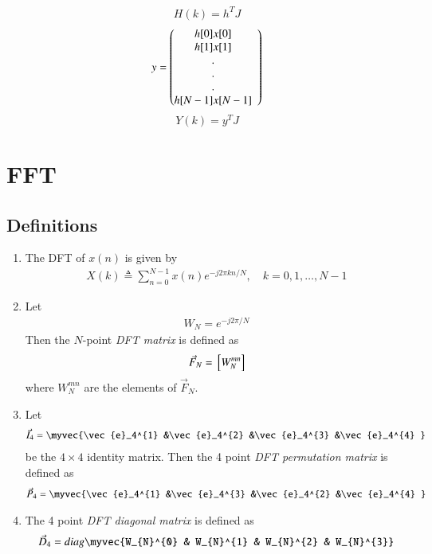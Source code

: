 \documentclass[journal,12pt,twocolumn]{IEEEtran}
\renewcommand\thesection{\arabic{section}}
\begin{document}
\begin{enumerate}[label=\thesection.\arabic*]
\begin{equation}
    H(k) = h^{T} J
\end{equation}
\[
\begin{array}{lc}
    y = 
  \left(\begin{array}{@{}ccc@{}}
    h[0] x[0] \\
    h[1] x[1] \\
    . \\
    . \\
    . \\
    h[N-1] x[N-1] \\
  \end{array}\right) \\[15pt]
\end{array}
\]
\begin{equation}
    Y(k) = y^{T} J
\end{equation} 

\end{enumerate}
%
\section{FFT}
\subsection{Definitions}
\begin{enumerate}[label=\arabic*.,ref=\thesection.\theenumi]
	\item The DFT of $x(n)$ is given by
	\begin{align}
		X(k) \triangleq \sum_{n=0}^{N-1} x(n) e^{-j 2 \pi k n / N}, \quad k=0,1, \ldots, N-1
	\end{align}
	\item Let 
	\begin{align}
		W_{N} = e^{-j2\pi/N} 
	\end{align}
	Then the $N$-point {\em DFT matrix} is defined as 
	\begin{align}
		\vec{F}_{N} = {}\left[W_{N}^{mn}\right]
	\end{align}
	where $W_{N}^{mn}$ are the elements of $\vec{F}_{N}$.
	\item Let 
	\begin{align}
		\vec{I}_4 = \myvec{\vec{e}_4^{1} &\vec{e}_4^{2} &\vec{e}_4^{3} &\vec{e}_4^{4} }
	\end{align}
	be the $4\times 4$ identity matrix.  Then the 4 point {\em DFT permutation matrix} is defined as 
	\begin{align}
		\vec{P}_4 = \myvec{\vec{e}_4^{1} &\vec{e}_4^{3} &\vec{e}_4^{2} &\vec{e}_4^{4} }
	\end{align}
	\item The 4 point {\em DFT diagonal matrix} is defined as 
	\begin{align}
		\vec{D}_4 = diag\myvec{W_{N}^{0} & W_{N}^{1} & W_{N}^{2} & W_{N}^{3}}
	\end{align}
\end{enumerate}
\end{document}
